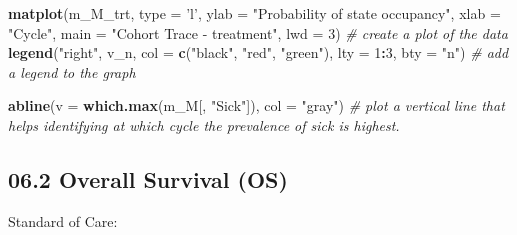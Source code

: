 \documentclass[
]{article}
\newenvironment{Shaded}{\begin{snugshade}}{\end{snugshade}}
\newcommand{\CommentTok}[1]{\textcolor[rgb]{0.56,0.35,0.01}{\textit{#1}}}
\newcommand{\DataTypeTok}[1]{\textcolor[rgb]{0.13,0.29,0.53}{#1}}
\newcommand{\DecValTok}[1]{\textcolor[rgb]{0.00,0.00,0.81}{#1}}
\newcommand{\KeywordTok}[1]{\textcolor[rgb]{0.13,0.29,0.53}{\textbf{#1}}}
\newcommand{\NormalTok}[1]{#1}
\newcommand{\OperatorTok}[1]{\textcolor[rgb]{0.81,0.36,0.00}{\textbf{#1}}}
\newcommand{\StringTok}[1]{\textcolor[rgb]{0.31,0.60,0.02}{#1}}
\begin{document}
\begin{Shaded}
\begin{Highlighting}[]
\KeywordTok{matplot}\NormalTok{(m_M_trt, }\DataTypeTok{type =} \StringTok{'l'}\NormalTok{, }
        \DataTypeTok{ylab =} \StringTok{"Probability of state occupancy"}\NormalTok{,}
        \DataTypeTok{xlab =} \StringTok{"Cycle"}\NormalTok{,}
        \DataTypeTok{main =} \StringTok{"Cohort Trace - treatment"}\NormalTok{, }\DataTypeTok{lwd =} \DecValTok{3}\NormalTok{)     }\CommentTok{# create a plot of the data}
\KeywordTok{legend}\NormalTok{(}\StringTok{"right"}\NormalTok{, v_n, }\DataTypeTok{col =} \KeywordTok{c}\NormalTok{(}\StringTok{"black"}\NormalTok{, }\StringTok{"red"}\NormalTok{, }\StringTok{"green"}\NormalTok{), }
       \DataTypeTok{lty =} \DecValTok{1}\OperatorTok{:}\DecValTok{3}\NormalTok{, }\DataTypeTok{bty =} \StringTok{"n"}\NormalTok{)                            }\CommentTok{# add a legend to the graph}

\KeywordTok{abline}\NormalTok{(}\DataTypeTok{v =} \KeywordTok{which.max}\NormalTok{(m_M[, }\StringTok{"Sick"}\NormalTok{]), }\DataTypeTok{col =} \StringTok{"gray"}\NormalTok{)      }\CommentTok{# plot a vertical line that helps identifying at which cycle the prevalence of sick is highest.  }
\end{Highlighting}
\end{Shaded}

\hypertarget{overall-survival-os}{%
\subsection{06.2 Overall Survival (OS)}\label{overall-survival-os}}

Standard of Care:
\end{document}
